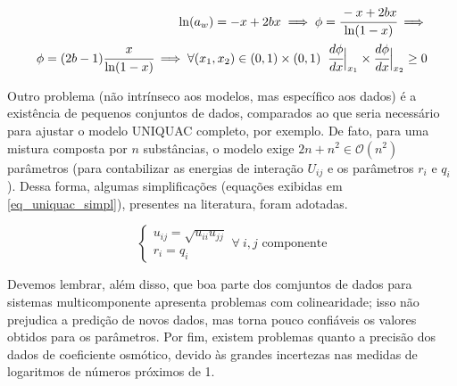 \documentclass[
	12pt,				%
	openright,
	twoside,
	a4paper,			%
	english,			%
	french,				%
	brazil				%
	]{abntex2}
\begin{document}
\begin{equation}
	\label{eq_phi_virial_mono_frac}
	\begin{split}
		\ln(a_w) = -x + 2bx \implies \phi =
			\cfrac{-x + 2bx}{\ln(1-x)}\implies\\
		\phi = (2b-1)\cfrac{x}{\ln(1-x)} \implies
			\forall (x_1,x_2) \in (0,1)\times(0,1)\;\;
			\cfrac{d\phi}{dx}\Big|_{x_1} \times
			\cfrac{d\phi}{dx}\Big|_{x_2} \ge 0
	\end{split}
\end{equation}

Outro problema (não intrínseco aos modelos, mas específico aos dados) é a
existência de pequenos conjuntos de dados, comparados ao que seria
necessário para ajustar o modelo UNIQUAC completo, por exemplo. De fato,
para uma mistura composta por $n$ substâncias, o modelo exige
$2n+n^2 \in \mathcal{O}(n^2)$ parâmetros (para contabilizar as energias de
interação $U_{ij}$ e os parâmetros $r_i$ e $q_i$). Dessa forma, algumas
simplificações (equações exibidas em \ref{eq_uniquac_simpl}), presentes
na literatura, foram adotadas.

\begin{equation}
	\label{eq_uniquac_simpl}
	\begin{cases}
		u_{ij} = \sqrt{u_{ii}u_{jj}}\\
		r_i = q_i
	\end{cases}\forall\ i, j\text{ componente}
\end{equation}

Devemos lembrar, além disso, que boa parte dos comjuntos de dados para sistemas
multicomponente apresenta problemas com colinearidade; isso não prejudica a
predição de novos dados, mas torna pouco confiáveis os valores obtidos para os
parâmetros. Por fim, existem problemas quanto a precisão dos dados de coeficiente
osmótico, devido às grandes incertezas nas medidas de logaritmos de números
próximos de 1.
\end{document}
